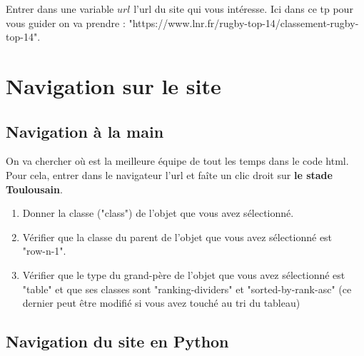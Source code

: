 \documentclass[12pt,fleqn]{article} %
\begin{document}
Entrer dans une variable $url$ l'url du site qui vous intéresse. Ici dans ce tp pour vous guider on va prendre : "https://www.lnr.fr/rugby-top-14/classement-rugby-top-14". 

\section{Navigation sur le site}
\subsection{Navigation à la main}

On va chercher où est la meilleure équipe de tout les temps dans le code html. Pour cela, entrer dans le navigateur l'url et faîte un clic droit sur \textbf{le stade Toulousain}.

\begin{exercise}
\begin{enumerate}
	\item Donner la classe ("class") de l'objet que vous avez sélectionné.
	\item Vérifier que la classe du parent de l'objet que vous avez sélectionné est\\ {"row-n-1"}.
	\item Vérifier que le type du grand-père de l'objet que vous avez sélectionné est "table" et que ses classes sont "ranking-dividers" et "sorted-by-rank-asc" (ce dernier peut être modifié si vous avez touché au tri du tableau)
\end{enumerate}
\end{exercise}

\subsection{Navigation du site en Python}
\end{document}
